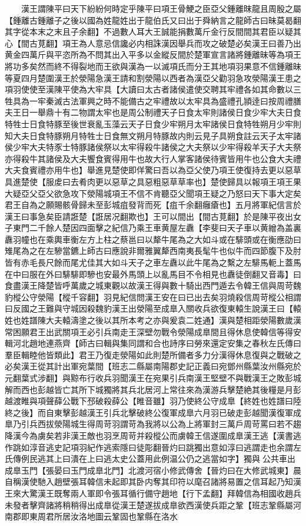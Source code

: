 　　漢王謂陳平曰天下紛紛何時定乎陳平曰項王骨鯁之臣亞父鍾離昩龍且周殷之屬【鍾離古鍾離子之後以國為姓龍姓出于龍伯氏又曰出于舜納言之龍師古曰昧莫曷翻其字從本末之末且子余翻】不過數人耳大王誠能捐數萬斤金行反間間其君臣以疑其心【間古莧翻】項王為人意忌信讒必内相誅漢因舉兵而攻之破楚必矣漢王曰善乃出黄金四萬斤與平恣所為不問其出入平多以金縱反間於楚軍宣言諸將鍾離昧等為項王將功多矣然而終不得裂地而王欲與漢為一以滅項氏而分王其地項羽果意不信鍾離昧等夏四月楚圍漢王於滎陽急漢王請和割滎陽以西者為漢亞父勸羽急攻滎陽漢王患之項羽使使至漢陳平使為大牢具【大讀曰太古者諸侯遣使交聘其牢禮各如其命數以三牲具為一牢秦滅古法軍興之時不能備古之牢禮故以太牢具為盛禮孔頴逹曰按周禮膳夫王日一舉鼎十有二物謂太牢也是周公制禮天子日食太牢則諸侯日食少牢大夫日食特牲士日食特豚至後世衰亂玉藻云天子日食少牢朔月太牢諸侯日食特牲朔月少牢則知大夫日食特豚朔月特牲士日食無文朔月特豚故内則云見子具朔食註云天子太牢諸侯少牢大夫特豕士特豚諸侯祭以太牢得殺牛諸侯之大夫祭以少牢得殺羊天子大夫祭亦得殺牛其諸侯及大夫饗食賓得用牛也故大行人掌客諸侯待賓皆用牛也公食大夫禮大夫食賓禮亦用牛也】舉進見楚使即佯驚曰吾以為亞父使乃項王使復持去更以惡草具進楚使【服䖍曰去肴肉更以惡草之具惡粗惡草草率也】楚使歸具以報項王項王果大疑亞父亞父欲急攻下滎陽城項王不信不肯聽亞父聞項王疑之乃怒曰天下事大定矣君王自為之願賜骸骨歸未至彭城疽發背而死【疽千余翻癰瘡也】五月將軍紀信言於漢王曰事急矣臣請誑楚【誑居况翻欺也】王可以間出【間古莧翻】於是陳平夜出女子東門二千餘人楚因四面擊之紀信乃乘王車黄屋左纛【李斐曰天子車以黄繒為盖裏纛羽幢也在乘輿車衡左方上柱之蔡邕曰以犛牛尾為之大如斗或在騑頭或在衡應劭曰雉尾為之在左驂當鑣上師古曰應說非爾雅翼犛西南夷長髦牛也似牛而四節腹下及肘皆有赤毛長尺餘而尾尤佳其大如斗天子之車左纛以此牛尾為之繫之左騑馬軛上蓋馬在中曰服在外曰騑騑即驂也安最外馬頭上以亂馬目不令相見也纛徒倒翻又音毒】曰食盡漢王降楚皆呼萬歲之城東觀以故漢王得與數十騎出西門遁去令韓王信與周苛魏豹樅公守滎陽【樅千容翻】羽見紀信問漢王安在曰已出去矣羽燒殺信周苛樅公相謂曰反國之王難與守城因殺魏豹漢王出滎陽至成臯入關收兵欲復東轅生說漢王曰【轅姓也姓譜陳大夫轅濤塗之後以其所本考之亦與爰袁二姓通】漢與楚相距滎陽數歲漢常困願君王出武關項王必引兵南走王深壁勿戰令滎陽成臯間且得休息使韓信等得安輯河北趙地連燕齊【師古曰輯與集同謂和合也詩序曰勞來還定安集之春秋左氏傳曰羣臣輯睦他皆類此】君王乃復走滎陽如此則楚所備者多力分漢得休息復與之戰破之必矣漢王從其計出軍宛葉間【班志二縣屬南陽郡史記正義曰宛鄧州縣葉汝州縣宛於元翻葉式涉翻】與黥布行收兵羽聞漢王在宛果引兵南漢王堅壁不與戰漢王之敗彭城解而西也彭越皆亡其所下城獨將其兵北居河上常往來為漢游兵擊楚絶其後糧是月彭越渡睢與項聲薛公戰下邳破殺薛公【睢音雖】羽乃使終公守成臯【終姓也姓譜曰陸終之後】而自東擊彭越漢王引兵北擊破終公復軍成臯六月羽已破走彭越聞漢復軍成臯乃引兵西拔滎陽城生得周苛羽謂苛為我將以公為上將軍封三萬戶周苛罵曰若不趨降漢今為虜矣若非漢王敵也羽烹周苛并殺樅公而虜韓王信遂圍成臯漢王逃【漢書逃作跳如淳音逃史記項羽紀作逃索隱曰徒彫翻晉灼曰跳獨出意如淳曰逃謂走也余謂左氏傳例民逃其上曰潰在上曰逃太史公蓋用此例温公仍之逃當如字】獨與公共車出成臯玉門【張晏曰玉門成臯北門】北渡河宿小修武傳舍【晉灼曰在大修武城東】晨自稱漢使馳入趙壁張耳韓信未起即其卧内奪其印符以麾召諸將易置之信耳起乃知漢王來大驚漢王既奪兩人軍即令張耳循行備守趙地【行下孟翻】拜韓信為相國收趙兵未發者擊齊諸將稍稍得出成臯從漢王楚遂拔成臯欲西漢使兵距之鞏【班志鞏縣屬河南郡即東周君所居汝洛地圖云鞏固也鞏縣在洛水